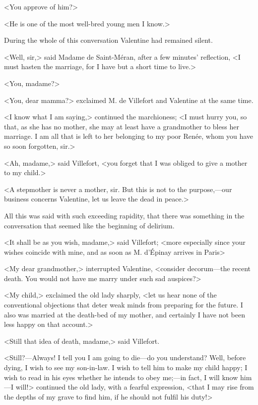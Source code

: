  <You approve of him?> 

 <He is one of the most well-bred young men I know.> 

 During the whole of this conversation Valentine had remained silent. 

 <Well, sir,> said Madame de Saint-Méran, after a few minutes' reflection, <I must hasten the marriage, for I have but a short time to live.> 

 <You, madame?>

<You, dear mamma?> exclaimed M. de Villefort and Valentine at the same time. 

 <I know what I am saying,> continued the marchioness; <I must hurry you, so that, as she has no mother, she may at least have a grandmother to bless her marriage. I am all that is left to her belonging to my poor Renée, whom you have so soon forgotten, sir.> 

 <Ah, madame,> said Villefort, <you forget that I was obliged to give a mother to my child.> 

 <A stepmother is never a mother, sir. But this is not to the purpose,—our business concerns Valentine, let us leave the dead in peace.> 

 All this was said with such exceeding rapidity, that there was something in the conversation that seemed like the beginning of delirium. 

 <It shall be as you wish, madame,> said Villefort; <more especially since your wishes coincide with mine, and as soon as M. d'Épinay arrives in Paris\longdash>

<My dear grandmother,> interrupted Valentine, <consider decorum—the recent death. You would not have me marry under such sad auspices?> 

 <My child,> exclaimed the old lady sharply, <let us hear none of the conventional objections that deter weak minds from preparing for the future. I also was married at the death-bed of my mother, and certainly I have not been less happy on that account.> 

 <Still that idea of death, madame,> said Villefort. 

 <Still?—Always! I tell you I am going to die—do you understand? Well, before dying, I wish to see my son-in-law. I wish to tell him to make my child happy; I wish to read in his eyes whether he intends to obey me;—in fact, I will know him—I will!> continued the old lady, with a fearful expression, <that I may rise from the depths of my grave to find him, if he should not fulfil his duty!> 

